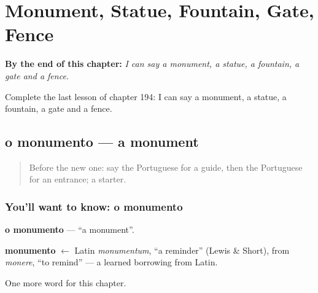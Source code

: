 
\chapter{Monument, Statue, Fountain, Gate, Fence}
\label{ch:pt-monument-statue-fountain-gate-fence}

\begin{chapteropening}
\textbf{By the end of this chapter:} \emph{I can say a monument, a statue, a fountain, a gate and a fence.}

Complete the last lesson of chapter 194: I can say a monument, a statue, a fountain, a gate and a fence.
\end{chapteropening}

\section[o monumento]{o monumento — a monument}

\label{lesson:PT-C194-monumento}



\begin{quote}
Before the new one: say the Portuguese for a guide, then the Portuguese for an entrance; a starter.
\end{quote}

\subsection*{You'll want to know: o monumento}
\textbf{o monumento} — \textquotedblleft{}a monument\textquotedblright{}.

\begin{cousinweb}
\textbf{monumento} $\leftarrow$ Latin \emph{monumentum}, \textquotedblleft{}a reminder\textquotedblright{} (Lewis \& Short), from \emph{monere}, \textquotedblleft{}to remind\textquotedblright{} — a learned borrowing from Latin.
\end{cousinweb}

\begin{grammarlens}[title={What you've built}]
One more word for this chapter.
\end{grammarlens}

